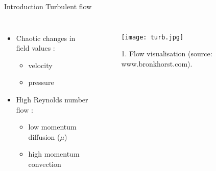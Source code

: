 \documentclass [xcolor=svgnames, t] {beamer}
\begin{document}
\begin{frame}{Introduction }
Turbulent flow 
 \begin{center}
    

\begin{columns}[onlytextwidth]
\begin{itemize}
\item Chaotic changes in field values :
\begin{itemize}
    \item velocity
    \item pressure
\end{itemize}
\item High Reynolds number flow :
\vspace{2.5mm}
\begin{itemize}
    \item low momentum diffusion ($\mu$)
    \item high momentum convection  
\end{itemize}





\end{itemize}



\begin{figure}
    \centering
    \texttt{[image: turb.jpg]}
    \caption{1. Flow visualisation (source: www.bronkhorst.com).}
\end{figure}

\end{columns}

\end{center}

  
\end{frame}
\end{document}
